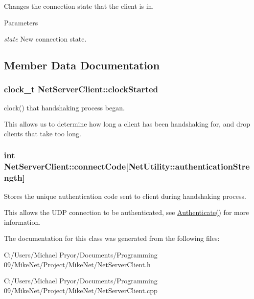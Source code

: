Changes the connection state that the client is in. 


\begin{DoxyParams}{Parameters}
\item[{\em state}]New connection state. \end{DoxyParams}


\subsection{Member Data Documentation}
\hypertarget{class_net_server_client_af7cf5f0a7c11223afb74fde89b9d0424}{
\subsubsection[{clockStarted}]{\setlength{\rightskip}{0pt plus 5cm}clock\_\-t {\bf NetServerClient::clockStarted}}}
\label{class_net_server_client_af7cf5f0a7c11223afb74fde89b9d0424}


clock() that handshaking process began. 

This allows us to determine how long a client has been handshaking for, and drop clients that take too long. \hypertarget{class_net_server_client_a8a0157c321e8659bf67047824ee35202}{
\subsubsection[{connectCode}]{\setlength{\rightskip}{0pt plus 5cm}int {\bf NetServerClient::connectCode}\mbox{[}{\bf NetUtility::authenticationStrength}\mbox{]}}}
\label{class_net_server_client_a8a0157c321e8659bf67047824ee35202}


Stores the unique authentication code sent to client during handshaking process. 

This allows the UDP connection to be authenticated, see \hyperlink{class_net_server_client_ab161769baaf09d648e3646c82d92ebce}{Authenticate()} for more information. 

The documentation for this class was generated from the following files:\begin{DoxyCompactItemize}
\item 
C:/Users/Michael Pryor/Documents/Programming 09/MikeNet/Project/MikeNet/NetServerClient.h\item 
C:/Users/Michael Pryor/Documents/Programming 09/MikeNet/Project/MikeNet/NetServerClient.cpp\end{DoxyCompactItemize}
